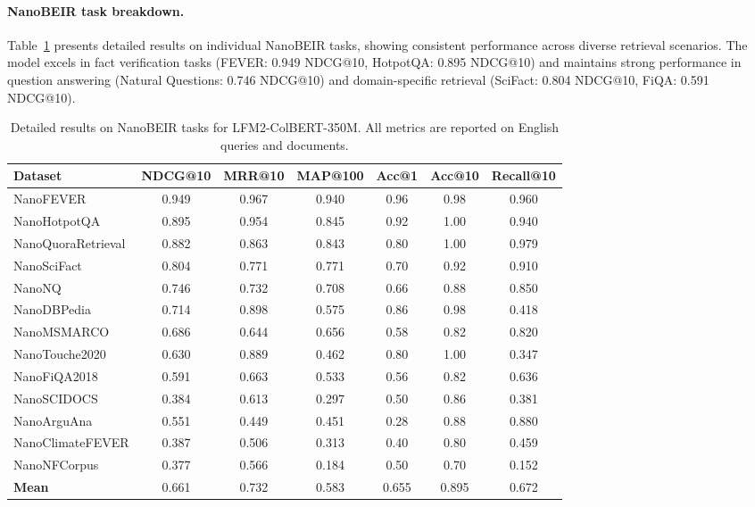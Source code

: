 \documentclass{article}
\begin{document}
\paragraph{NanoBEIR task breakdown.}
Table~\ref{tab:colbert_nanobeir} presents detailed results on individual NanoBEIR tasks, showing consistent performance across diverse retrieval scenarios. The model excels in fact verification tasks (FEVER: 0.949 NDCG@10, HotpotQA: 0.895 NDCG@10) and maintains strong performance in question answering (Natural Questions: 0.746 NDCG@10) and domain-specific retrieval (SciFact: 0.804 NDCG@10, FiQA: 0.591 NDCG@10).

\begin{table}[h]
\centering
\small
\begin{tabular}{lcccccc}
\toprule
\textbf{Dataset} & \textbf{NDCG@10} & \textbf{MRR@10} & \textbf{MAP@100} & \textbf{Acc@1} & \textbf{Acc@10} & \textbf{Recall@10} \\
\midrule
NanoFEVER & 0.949 & 0.967 & 0.940 & 0.96 & 0.98 & 0.960 \\
NanoHotpotQA & 0.895 & 0.954 & 0.845 & 0.92 & 1.00 & 0.940 \\
NanoQuoraRetrieval & 0.882 & 0.863 & 0.843 & 0.80 & 1.00 & 0.979 \\
NanoSciFact & 0.804 & 0.771 & 0.771 & 0.70 & 0.92 & 0.910 \\
NanoNQ & 0.746 & 0.732 & 0.708 & 0.66 & 0.88 & 0.850 \\
NanoDBPedia & 0.714 & 0.898 & 0.575 & 0.86 & 0.98 & 0.418 \\
NanoMSMARCO & 0.686 & 0.644 & 0.656 & 0.58 & 0.82 & 0.820 \\
NanoTouche2020 & 0.630 & 0.889 & 0.462 & 0.80 & 1.00 & 0.347 \\
NanoFiQA2018 & 0.591 & 0.663 & 0.533 & 0.56 & 0.82 & 0.636 \\
NanoSCIDOCS & 0.384 & 0.613 & 0.297 & 0.50 & 0.86 & 0.381 \\
NanoArguAna & 0.551 & 0.449 & 0.451 & 0.28 & 0.88 & 0.880 \\
NanoClimateFEVER & 0.387 & 0.506 & 0.313 & 0.40 & 0.80 & 0.459 \\
NanoNFCorpus & 0.377 & 0.566 & 0.184 & 0.50 & 0.70 & 0.152 \\
\midrule
\textbf{Mean} & 0.661 & 0.732 & 0.583 & 0.655 & 0.895 & 0.672 \\
\bottomrule
\end{tabular}
\caption{Detailed results on NanoBEIR tasks for LFM2-ColBERT-350M. All metrics are reported on English queries and documents.}
\label{tab:colbert_nanobeir}
\end{table}
\end{document}
